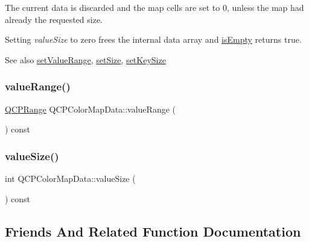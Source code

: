 The current data is discarded and the map cells are set to 0, unless the map had already the requested size.

Setting {\itshape value\+Size} to zero frees the internal data array and \mbox{\hyperlink{class_q_c_p_color_map_data_aea88cc75a76ca571acf29b2ba8ac970d}{is\+Empty}} returns true.

\begin{DoxySeeAlso}{See also}
\mbox{\hyperlink{class_q_c_p_color_map_data_ada1b2680ba96a5f4175b6d341cf75d23}{set\+Value\+Range}}, \mbox{\hyperlink{class_q_c_p_color_map_data_a0d9ff35c299d0478b682bfbcdd9c097e}{set\+Size}}, \mbox{\hyperlink{class_q_c_p_color_map_data_ac7ef70e383aface34b44dbde49234b6b}{set\+Key\+Size}} 
\end{DoxySeeAlso}
\mbox{\label{class_q_c_p_color_map_data_a818e4e384aa4e5fad69ac603924394d3}} 
\subsubsection{\texorpdfstring{valueRange()}{valueRange()}}
{\footnotesize\ttfamily \mbox{\hyperlink{class_q_c_p_range}{Q\+C\+P\+Range}} Q\+C\+P\+Color\+Map\+Data\+::value\+Range (\begin{DoxyParamCaption}{ }\end{DoxyParamCaption}) const\hspace{0.3cm}{\ttfamily [inline]}}

\mbox{\label{class_q_c_p_color_map_data_a8510cafea24645bbb62b5e0bfc43209f}} 
\subsubsection{\texorpdfstring{valueSize()}{valueSize()}}
{\footnotesize\ttfamily int Q\+C\+P\+Color\+Map\+Data\+::value\+Size (\begin{DoxyParamCaption}{ }\end{DoxyParamCaption}) const\hspace{0.3cm}{\ttfamily [inline]}}



\subsection{Friends And Related Function Documentation}
\mbox{\label{class_q_c_p_color_map_data_afa9d9eab63af3e6f20f882c8d7cc9f20}} 
